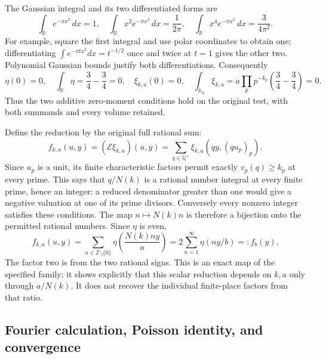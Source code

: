 The Gaussian integral and its two differentiated forms are
\begin{equation}\tag{ETC3}
 \int_{\mathbb R}e^{-\pi x^2}\,dx=1,\quad
 \int_{\mathbb R}x^2e^{-\pi x^2}\,dx=\frac1{2\pi},\quad
 \int_{\mathbb R}x^4e^{-\pi x^2}\,dx=\frac3{4\pi^2}.
\end{equation}
For example, square the first integral and use polar coordinates to
obtain one; differentiating
$\int e^{-\pi t x^2}dx=t^{-1/2}$ once and twice at $t=1$
gives the other two. Polynomial Gaussian bounds justify both
differentiations. Consequently
\begin{equation}\tag{ETC4}
 \eta(0)=0,\quad \int_{\mathbb R}\eta=\frac34-\frac34=0,
 \quad \xi_{k,a}(0)=0,\quad
 \int_{\mathbb A_{\mathbb Q}}\xi_{k,a}
 =a\prod_pp^{-k_p}\left(\frac34-\frac34\right)=0.
\end{equation}
Thus the two additive zero-moment conditions hold on the original
test, with both summands and every volume retained.

Define the reduction by the original full rational sum:
\begin{equation}\tag{ETC5}
 f_{k,a}(u,y)=(\mathcal E\xi_{k,a})(u,y)
 =\sum_{q\in\mathbb Q^\times}\xi_{k,a}(qy,(qu_p)_p).
\end{equation}
Since $u_p$ is a unit, its finite characteristic factors permit exactly
$v_p(q)\ge k_p$ at every prime. This says that $q/N(k)$ is a rational
number integral at every finite prime, hence an integer: a reduced
denominator greater than one would give a negative valuation at one
of its prime divisors. Conversely every nonzero integer satisfies
these conditions. The map $n\mapsto N(k)n$ is therefore a bijection
onto the permitted rational numbers. Since $\eta$ is even,
\begin{equation}\tag{ETC6}
 f_{k,a}(u,y)=\sum_{n\in\mathbb Z\setminus\{0\}}
             \eta\left(\frac{N(k)ny}{a}\right)
 =2\sum_{n=1}^{\infty}\eta(ny/b)=:f_b(y).
\end{equation}
The factor two is from the two rational signs. This is an exact map
of the specified family; it shows explicitly that this scalar
reduction depends on $k,a$ only through $a/N(k)$. It does not recover
the individual finite-place factors from that ratio.

\subsection{Fourier calculation, Poisson identity, and convergence}

